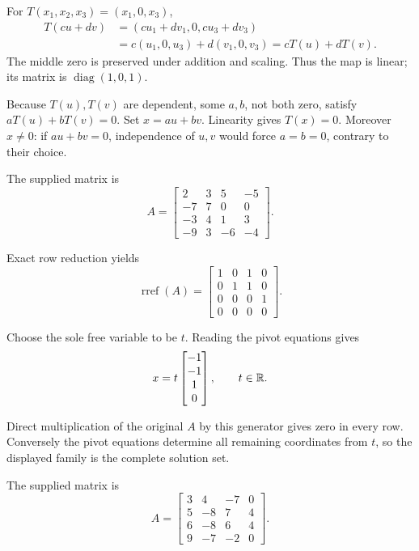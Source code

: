 For $T(x_1,x_2,x_3)=(x_1,0,x_3)$,
\begin{align*}
 T(cu+dv)&=(cu_1+dv_1,0,cu_3+dv_3)\\
 &=c(u_1,0,u_3)+d(v_1,0,v_3)=cT(u)+dT(v).
\end{align*}
The middle zero is preserved under addition and scaling. Thus the map
is linear; its matrix is $\operatorname{diag}(1,0,1)$.

Because $T(u),T(v)$ are dependent, some $a,b$, not both zero,
satisfy $aT(u)+bT(v)=0$. Set $x=au+bv$. Linearity gives
$T(x)=0$. Moreover $x\ne0$: if $au+bv=0$, independence of
$u,v$ would force $a=b=0$, contrary to their choice.



The supplied matrix is
\[ A=\begin{bmatrix}2 & 3 & 5 & -5\\-7 & 7 & 0 & 0\\-3 & 4 & 1 & 3\\-9 & 3 & -6 & -4\end{bmatrix}.\]

Exact row reduction yields
\[ \operatorname{rref}(A)=\begin{bmatrix}1 & 0 & 1 & 0\\0 & 1 & 1 & 0\\0 & 0 & 0 & 1\\0 & 0 & 0 & 0\end{bmatrix}.\]

Choose the sole free variable to be $t$. Reading the pivot equations gives
\[ x=t\begin{bmatrix}-1\\-1\\1\\0\end{bmatrix},\qquad t\in\mathbb{R}.\]

Direct multiplication of the original $A$ by this generator gives zero in every row. Conversely the pivot equations determine all remaining coordinates from $t$, so the displayed family is the complete solution set.



The supplied matrix is
\[ A=\begin{bmatrix}3 & 4 & -7 & 0\\5 & -8 & 7 & 4\\6 & -8 & 6 & 4\\9 & -7 & -2 & 0\end{bmatrix}.\]

